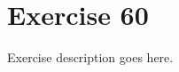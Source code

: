 \section{Exercise 60}
\begin{question}
   Exercise description goes here. 
\end{question}

\begin{solution}
\end{solution}
